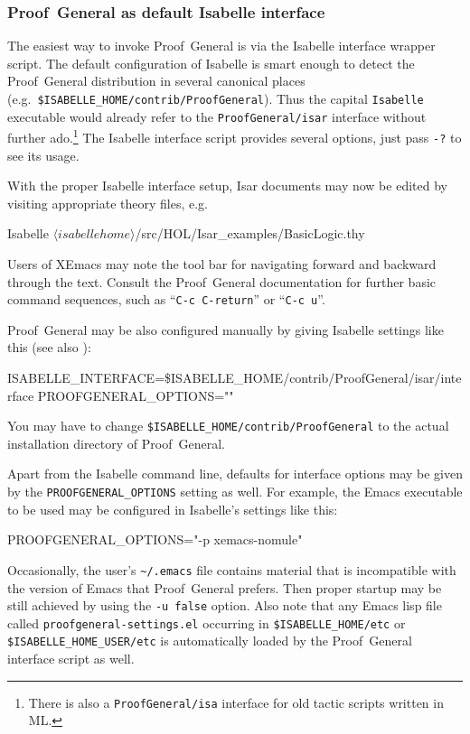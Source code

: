\subsubsection{Proof~General as default Isabelle interface}

The easiest way to invoke Proof~General is via the Isabelle interface wrapper
script.  The default configuration of Isabelle is smart enough to detect the
Proof~General distribution in several canonical places (e.g.\ 
\texttt{\$ISABELLE_HOME/contrib/ProofGeneral}).  Thus the capital
\texttt{Isabelle} executable would already refer to the
\texttt{ProofGeneral/isar} interface without further ado.\footnote{There is
  also a \texttt{ProofGeneral/isa} interface for old tactic scripts written in
  ML.} The Isabelle interface script provides several options, just pass
\verb,-?, to see its usage.

With the proper Isabelle interface setup, Isar documents may now be edited by
visiting appropriate theory files, e.g.\ 
\begin{ttbox}
Isabelle \({\langle}isabellehome{\rangle}\)/src/HOL/Isar_examples/BasicLogic.thy
\end{ttbox}
Users of XEmacs may note the tool bar for navigating forward and backward
through the text.  Consult the Proof~General documentation \cite{proofgeneral}
for further basic command sequences, such as ``\texttt{C-c C-return}'' or
``\texttt{C-c u}''.

\medskip

Proof~General may be also configured manually by giving Isabelle settings like
this (see also \cite{isabelle-sys}):
\begin{ttbox}
ISABELLE_INTERFACE=\$ISABELLE_HOME/contrib/ProofGeneral/isar/interface
PROOFGENERAL_OPTIONS=""
\end{ttbox}
You may have to change \texttt{\$ISABELLE_HOME/contrib/ProofGeneral} to the
actual installation directory of Proof~General.

\medskip

Apart from the Isabelle command line, defaults for interface options may be
given by the \texttt{PROOFGENERAL_OPTIONS} setting as well.  For example, the
Emacs executable to be used may be configured in Isabelle's settings like this:
\begin{ttbox}
PROOFGENERAL_OPTIONS="-p xemacs-nomule"  
\end{ttbox}

Occasionally, the user's \verb,~/.emacs, file contains material that is
incompatible with the version of Emacs that Proof~General prefers.  Then
proper startup may be still achieved by using the \texttt{-u false} option.
Also note that any Emacs lisp file called \texttt{proofgeneral-settings.el}
occurring in \texttt{\$ISABELLE_HOME/etc} or \texttt{\$ISABELLE_HOME_USER/etc}
is automatically loaded by the Proof~General interface script as well.


